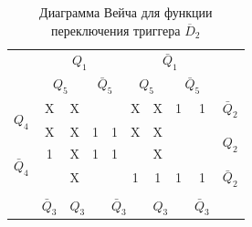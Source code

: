 \documentclass[a4paper,14pt]{article}
\begin{document}
\begin{table}[H]
	\begin{center}
		\caption{\label{tab:unD2_tab} Диаграмма Вейча для функции переключения триггера $\overline{D}_2$ }
		\begin{tabular}{cccccccccc}
			                                                  &                                         \multicolumn{4}{c}{$Q_1$}                                          &                                      \multicolumn{4}{c}{$\bar{Q}_1$}                                       &                        \\
			                                                  &                \multicolumn{2}{c}{$Q_5$}                 &         \multicolumn{2}{c}{$\bar{Q}_5$}         &            \multicolumn{2}{c}{$Q_5$}            &             \multicolumn{2}{c}{$\bar{Q}_5$}              &                        \\ \cline{2-9}
			   \multicolumn{1}{c|}{\multirow{2}{*}{$Q_4$}}    &     \multicolumn{1}{c|}{X}      & \multicolumn{1}{c|}{X} & \multicolumn{1}{c|}{}  & \multicolumn{1}{c|}{}  & \multicolumn{1}{c|}{X} & \multicolumn{1}{c|}{X} & \multicolumn{1}{c|}{1} &     \multicolumn{1}{c|}{1}      &      $\bar{Q}_2$       \\ \cline{2-9}
			              \multicolumn{1}{c|}{}               &     \multicolumn{1}{c|}{X}      & \multicolumn{1}{c|}{X} & \multicolumn{1}{c|}{1} & \multicolumn{1}{c|}{1} & \multicolumn{1}{c|}{X} & \multicolumn{1}{c|}{X} & \multicolumn{1}{c|}{}  &      \multicolumn{1}{c|}{}      & \multirow{2}{*}{$Q_2$} \\ \cline{2-9}
			\multicolumn{1}{c|}{\multirow{2}{*}{$\bar{Q}_4$}} &     \multicolumn{1}{c|}{1}      & \multicolumn{1}{c|}{X} & \multicolumn{1}{c|}{1} & \multicolumn{1}{c|}{1} & \multicolumn{1}{c|}{}  & \multicolumn{1}{c|}{X} & \multicolumn{1}{c|}{}  &      \multicolumn{1}{c|}{}      &                        \\ \cline{2-9}
			              \multicolumn{1}{c|}{}               &      \multicolumn{1}{c|}{}      & \multicolumn{1}{c|}{X} & \multicolumn{1}{c|}{}  & \multicolumn{1}{c|}{}  & \multicolumn{1}{c|}{1} & \multicolumn{1}{c|}{1} & \multicolumn{1}{c|}{1} &     \multicolumn{1}{c|}{1}      &      $\bar{Q}_2$       \\ \cline{2-9}
			                                                  &                                 &              \multicolumn{2}{c}{}               &              \multicolumn{2}{c}{}               &              \multicolumn{2}{c}{}               &                                 &                        \\
			              \multicolumn{1}{l}{}                & \multicolumn{1}{l}{$\bar{Q}_3$} & \multicolumn{2}{l}{$Q_3$}                       & \multicolumn{2}{l}{$\bar{Q}_3$}                 & \multicolumn{2}{l}{$Q_3$}                       & \multicolumn{1}{l}{$\bar{Q}_3$} &  \multicolumn{1}{l}{}
		\end{tabular}
	\end{center}
\end{table}
\end{document}
